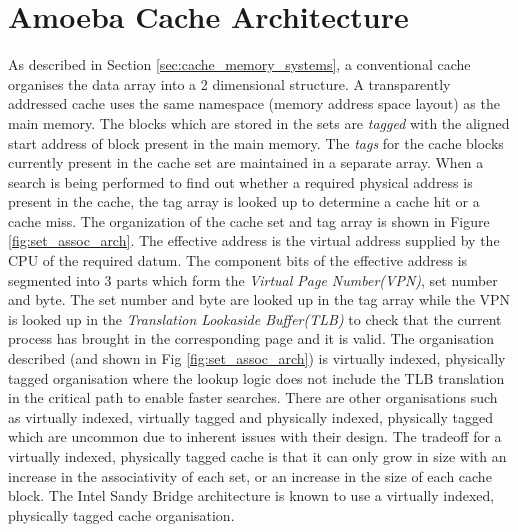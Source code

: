 %
%

\chapter{Amoeba Cache Architecture}
\label{chap:ac_architecture}

As described in Section \ref{sec:cache_memory_systems}, a conventional cache organises the data array into a 2 dimensional structure. A transparently addressed cache uses the same namespace (memory address space layout) as the main memory. The blocks which are stored in the sets are \textit{tagged} with the aligned start address of block present in the main memory. The \textit{tags} for the cache blocks currently present in the cache set are maintained in a separate array. When a search is being performed to find out whether a required physical address is present in the cache, the tag array is looked up to determine a cache hit or a cache miss. The organization of the cache set and tag array is shown in Figure \ref{fig:set_assoc_arch}. The effective address is the virtual address supplied by the CPU of the required datum. The component bits of the effective address is segmented into 3 parts which form the \textit{Virtual Page Number(VPN)}, set number and byte. The set number and byte are looked up in the tag array while the VPN is looked up in the \textit{Translation Lookaside Buffer(TLB)} to check that the current process has brought in the corresponding page and it is valid. The organisation described (and shown in Fig \ref{fig:set_assoc_arch}) is virtually indexed, physically tagged organisation where the lookup logic does not include the TLB translation in the critical path to enable faster searches. There are other organisations such as virtually indexed, virtually tagged and physically indexed, physically tagged which are uncommon due to inherent issues with their design. The tradeoff for a virtually indexed, physically tagged cache is that it can only grow in size with an increase in the associativity of each set, or an increase in the size of each cache block. The Intel Sandy Bridge architecture is known to use a virtually indexed, physically tagged cache organisation.

\newpage

